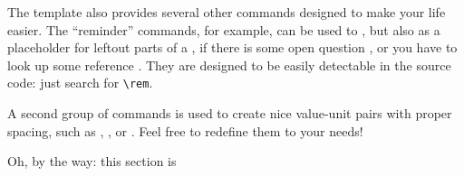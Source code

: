 
The template also provides several other commands designed to make your life easier. The ``reminder'' commands, for example, can be used to , but also as a placeholder for leftout parts of a \rem, if there is some open question \remq, or you have to look up some reference \remc. They are designed to be easily detectable in the source code: just search for \verb|\rem|. 

\nxtpar\noindent
A second group of commands is used to create nice value-unit pairs with proper spacing, such as , , or . Feel free to redefine them to your needs!

\nxtpar\noindent
Oh, by the way: this section is \uc






